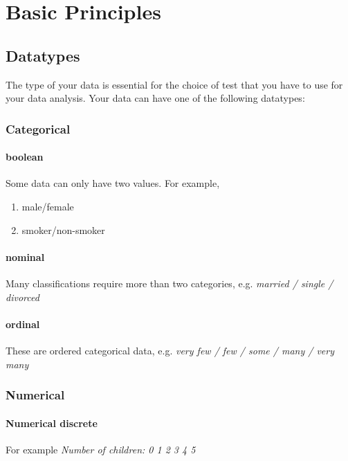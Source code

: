 \chapter{Basic Principles}

\section{Datatypes}

The type of your data is essential for the choice of test that you have to use for your data analysis. Your data can have one of the following datatypes:

\subsection{Categorical} 

\subsubsection{boolean}
Some data can only have two values. For example,
\begin{enumerate}
  \item male/female
  \item smoker/non-smoker
\end{enumerate}

\subsubsection{nominal}
Many classifications require more than two categories, e.g. \emph{married / single / divorced}

\subsubsection{ordinal}
These are ordered categorical data, e.g. \emph{very few / few / some / many / very many}

\subsection{Numerical}

\subsubsection{Numerical discrete}
For example \emph{Number of children: 0 1 2 3 4 5}

